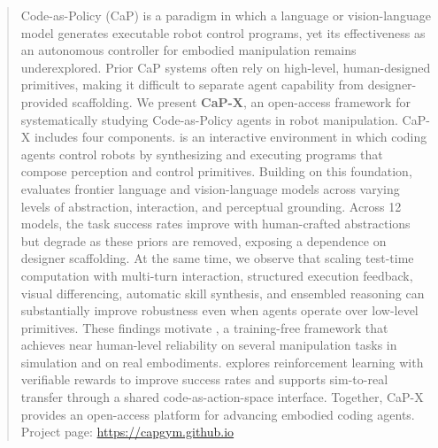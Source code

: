 \begin{abstract}

Code-as-Policy (CaP) is a paradigm in which a language or vision-language model generates executable robot control programs, yet its effectiveness as an autonomous controller for embodied manipulation remains underexplored. Prior CaP systems often rely on high-level, human-designed primitives, making it difficult to separate agent capability from designer-provided scaffolding. We present \textbf{CaP-X}, an open-access framework for systematically studying Code-as-Policy agents in robot manipulation. CaP-X includes four components. \textbf{\gymname{}} is an interactive environment in which coding agents control robots by synthesizing and executing programs that compose perception and control primitives. Building on this foundation, \textbf{\benchname{}} evaluates frontier language and vision-language models across varying levels of abstraction, interaction, and perceptual grounding. 
Across 
12 models, the task success rates improve with human-crafted abstractions but degrade as these priors are removed, exposing a dependence on designer scaffolding. At the same time, we observe that scaling test-time computation with multi-turn interaction, structured execution feedback, visual differencing, automatic skill synthesis, and ensembled reasoning can substantially improve robustness even when agents operate over low-level primitives. These findings motivate \textbf{\sysname{}}, a training-free framework that achieves near human-level reliability on several manipulation tasks in simulation and on real embodiments. \textbf{\rlname{}} explores reinforcement learning with verifiable rewards to improve success rates and supports sim-to-real transfer through a shared code-as-action-space interface. Together, CaP-X provides an open-access platform for advancing embodied coding agents.
Project page: \href{https://capgym.github.io}{https://capgym.github.io}







\end{abstract}
